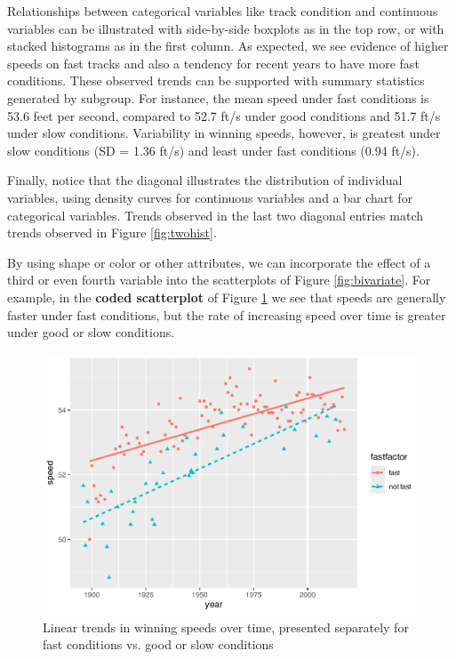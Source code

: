\documentclass[
]{krantz}
\begin{document}
Relationships between categorical variables like track condition and continuous variables can be illustrated with side-by-side boxplots as in the top row, or with stacked histograms as in the first column. As expected, we see evidence of higher speeds on fast tracks and also a tendency for recent years to have more fast conditions. These observed trends can be supported with summary statistics generated by subgroup. For instance, the mean speed under fast conditions is 53.6 feet per second, compared to 52.7 ft/s under good conditions and 51.7 ft/s under slow conditions. Variability in winning speeds, however, is greatest under slow conditions (SD = 1.36 ft/s) and least under fast conditions (0.94 ft/s).

Finally, notice that the diagonal illustrates the distribution of individual variables, using density curves for continuous variables and a bar chart for categorical variables. Trends observed in the last two diagonal entries match trends observed in Figure \ref{fig:twohist}.

By using shape or color or other attributes, we can incorporate the effect of a third or even fourth variable into the scatterplots of Figure \ref{fig:bivariate}. For example, in the \textbf{coded scatterplot}  of Figure \ref{fig:codeds} we see that speeds are generally faster under fast conditions, but the rate of increasing speed over time is greater under good or slow conditions.

\begin{figure}

{\centering \includegraphics[width=0.9\linewidth]{bookdown-BeyondMLR_files/figure-latex/codeds-1} 

}

\caption{Linear trends in winning speeds over time, presented separately for fast conditions vs. good or slow conditions}\label{fig:codeds}
\end{figure}
\end{document}
